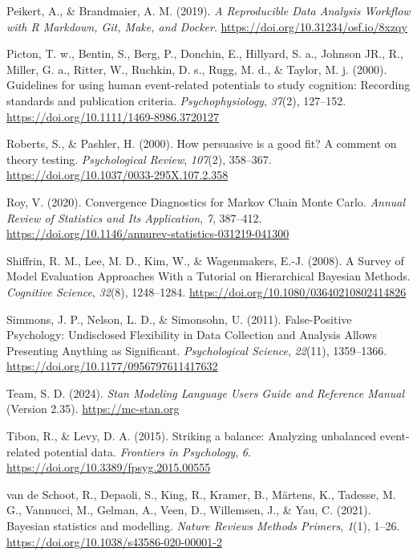 \documentclass[
  doc,12pt,floatsintext]{apa7}
\newlength{\cslhangindent}
\newenvironment{CSLReferences}[2] %
 {\begin{list}{}{%
  \setlength{\itemindent}{0pt}
  \setlength{\leftmargin}{0pt}
  \setlength{\parsep}{0pt}
  \ifodd #1
   \setlength{\leftmargin}{\cslhangindent}
   \setlength{\itemindent}{-1\cslhangindent}
  \fi
  \setlength{\itemsep}{#2\baselineskip}}}
 {\end{list}}
\begin{document}
\begin{CSLReferences}{1}{0}
Peikert, A., \& Brandmaier, A. M. (2019). \emph{A {Reproducible Data Analysis Workflow} with {R Markdown}, {Git}, {Make}, and {Docker}}. \url{https://doi.org/10.31234/osf.io/8xzqy}

Picton, T. w., Bentin, S., Berg, P., Donchin, E., Hillyard, S. a., Johnson JR., R., Miller, G. a., Ritter, W., Ruchkin, D. s., Rugg, M. d., \& Taylor, M. j. (2000). Guidelines for using human event-related potentials to study cognition: {Recording} standards and publication criteria. \emph{Psychophysiology}, \emph{37}(2), 127--152. \url{https://doi.org/10.1111/1469-8986.3720127}

Roberts, S., \& Pashler, H. (2000). How persuasive is a good fit? {A} comment on theory testing. \emph{Psychological Review}, \emph{107}(2), 358--367. \url{https://doi.org/10.1037/0033-295X.107.2.358}

Roy, V. (2020). Convergence {Diagnostics} for {Markov Chain Monte Carlo}. \emph{Annual Review of Statistics and Its Application}, \emph{7}, 387--412. \url{https://doi.org/10.1146/annurev-statistics-031219-041300}

Shiffrin, R. M., Lee, M. D., Kim, W., \& Wagenmakers, E.-J. (2008). A {Survey} of {Model Evaluation Approaches With} a {Tutorial} on {Hierarchical Bayesian Methods}. \emph{Cognitive Science}, \emph{32}(8), 1248--1284. \url{https://doi.org/10.1080/03640210802414826}

Simmons, J. P., Nelson, L. D., \& Simonsohn, U. (2011). False-{Positive Psychology}: {Undisclosed Flexibility} in {Data Collection} and {Analysis Allows Presenting Anything} as {Significant}. \emph{Psychological Science}, \emph{22}(11), 1359--1366. \url{https://doi.org/10.1177/0956797611417632}

Team, S. D. (2024). \emph{Stan {Modeling Language Users Guide} and {Reference Manual}} (Version 2.35). \url{https://mc-stan.org}

Tibon, R., \& Levy, D. A. (2015). Striking a balance: Analyzing unbalanced event-related potential data. \emph{Frontiers in Psychology}, \emph{6}. \url{https://doi.org/10.3389/fpsyg.2015.00555}

van de Schoot, R., Depaoli, S., King, R., Kramer, B., Märtens, K., Tadesse, M. G., Vannucci, M., Gelman, A., Veen, D., Willemsen, J., \& Yau, C. (2021). Bayesian statistics and modelling. \emph{Nature Reviews Methods Primers}, \emph{1}(1), 1--26. \url{https://doi.org/10.1038/s43586-020-00001-2}


\end{CSLReferences}
\end{document}
